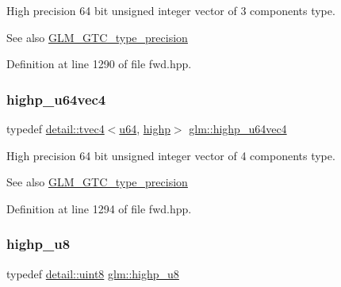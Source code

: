 High precision 64 bit unsigned integer vector of 3 components type. \begin{DoxySeeAlso}{See also}
\hyperlink{group__gtc__type__precision}{G\+L\+M\+\_\+\+G\+T\+C\+\_\+type\+\_\+precision} 
\end{DoxySeeAlso}


Definition at line 1290 of file fwd.\+hpp.

\mbox{\label{group__gtc__type__precision_ga8aa6fc9f16dfa3078d411f6361188a45}} 
\subsubsection{\texorpdfstring{highp\+\_\+u64vec4}{highp\_u64vec4}}
{\footnotesize\ttfamily typedef \hyperlink{structglm_1_1detail_1_1tvec4}{detail\+::tvec4}$<$\hyperlink{group__gtc__type__precision_ga71cedd4972f9cb1a5e14dfe5ab83ecd7}{u64}, \hyperlink{namespaceglm_a0f04f086094c747d227af4425893f545ac6f7eab42eacbb10d59a58e95e362074}{highp}$>$ \hyperlink{group__gtc__type__precision_ga8aa6fc9f16dfa3078d411f6361188a45}{glm\+::highp\+\_\+u64vec4}}

High precision 64 bit unsigned integer vector of 4 components type. \begin{DoxySeeAlso}{See also}
\hyperlink{group__gtc__type__precision}{G\+L\+M\+\_\+\+G\+T\+C\+\_\+type\+\_\+precision} 
\end{DoxySeeAlso}


Definition at line 1294 of file fwd.\+hpp.

\mbox{\label{group__gtc__type__precision_ga8a60abe782749c504fb5ae51eb8b49cc}} 
\subsubsection{\texorpdfstring{highp\+\_\+u8}{highp\_u8}}
{\footnotesize\ttfamily typedef \hyperlink{namespaceglm_1_1detail_aef2588f97d090cc19fbbe0c74fe17c8f}{detail\+::uint8} \hyperlink{group__gtc__type__precision_ga8a60abe782749c504fb5ae51eb8b49cc}{glm\+::highp\+\_\+u8}}

